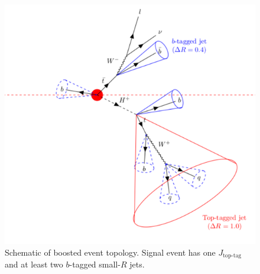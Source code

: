\begin{figure}[H]
  \centering
  \includegraphics[keepaspectratio,scale=0.8]{images/AnalysisStrategy/EventTopology.png}
  \caption{Schematic of boosted event topology. Signal event has one $J_{\text{top-tag}}$ and at least two $b$-tagged small-$R$ jets.}
  \label{fig:EventTopology_Htb}
\end{figure}

